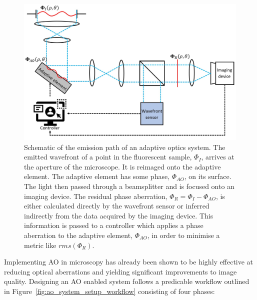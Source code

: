 \begin{figure}[h]
	\centering
	\includegraphics[width=\textwidth]{images/ao_system_schematic_simple.jpg}
	\caption[Schematic of the emission path of an adaptive optics
          system.]{Schematic of the emission path of an adaptive
          optics system. The emitted wavefront of a point in the
          fluorescent sample, $\Phi_{I}$, arrives at the aperture of
          the microscope. It is reimaged onto the adaptive
          element. The adaptive element has some phase, $\Phi_{AO}$,
          on its surface. The light then passed through a beamsplitter
          and is focused onto an imaging device. The residual phase
          aberration, $\Phi_{R} = \Phi_{I} - \Phi_{AO}$, is either
          calculated directly by the wavefront sensor or inferred
          indirectly from the data acquired by the imaging
          device. This information is passed to a controller which
          applies a phase aberration to the adaptive element,
          $\Phi_{AO}$, in order to minimise a metric like $rms(\Phi_{R})$.}
	\label{fig:ao_system_schematic_simple}
\end{figure}

Implementing AO in microscopy has already been shown to be highly 
effective at reducing optical aberrations and yielding significant 
improvements to image 
quality\cite{booth2014adaptive,girkin2009adaptive,fraisier2015adaptive,jesacher2011sensorless,
	jian2014wavefront}. Designing an AO enabled system follows a predicable 
workflow outlined in Figure~\ref{fig:ao_system_setup_workflow} 
consisting of four phases:

